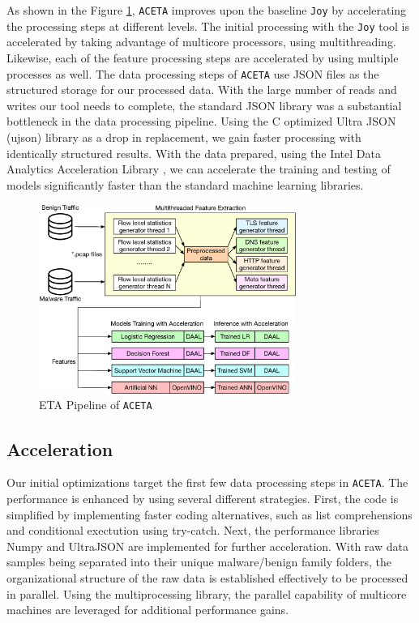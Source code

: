 As shown in the Figure \ref{figure:aceta}, \texttt{ACETA} improves upon the baseline \texttt{Joy} by accelerating the processing steps at different levels. The initial processing with the \texttt{Joy} tool is accelerated by taking advantage of multicore processors, using multithreading. Likewise, each of the feature processing steps are accelerated by using multiple processes as well. The data processing steps of \texttt{ACETA} use JSON files as the structured storage for our processed data. With the large number of reads and writes our tool needs to complete, the standard JSON library was a substantial bottleneck in the data processing pipeline. Using the C optimized Ultra JSON (ujson) library as a drop in replacement, we gain faster processing with identically structured results. With the data prepared, using the Intel Data Analytics Acceleration Library \cite{daal}, we can accelerate the training and testing of models significantly faster than the standard machine learning libraries.

\begin{figure}[h!]
	\centering
	\includegraphics[width=3.3in]{./fig/aceta-pipeline.eps}
	\caption{ETA Pipeline of \texttt{ACETA}}
	\label{figure:aceta}
\end{figure}

\subsection{Acceleration}
Our initial optimizations target the first few data processing steps in \texttt{ACETA}. The performance is enhanced by using several different strategies. First, the code is simplified by implementing faster coding alternatives, such as list comprehensions and conditional exectution using try-catch. Next, the performance libraries Numpy and UltraJSON are implemented for further acceleration. With raw data samples being separated into their unique malware/benign family folders, the organizational structure of the raw data is established effectively to be processed in parallel. Using the multiprocessing library, the parallel capability of multicore machines are leveraged for additional performance gains.

